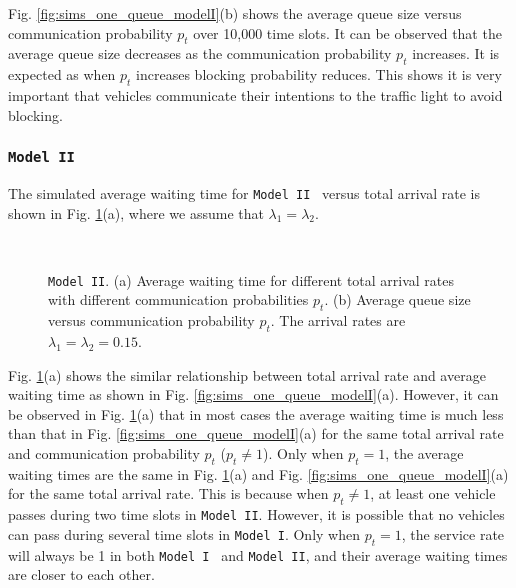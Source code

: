 \documentclass[conference]{IEEEtran}
\newcommand{\modelI}{{\tt{Model I}}}
\newcommand{\modelII}{{\tt{Model II}}}
\begin{document}
Fig. \ref{fig:sims_one_queue_modelI}(b) shows the average queue size versus communication probability $p_t$ over 10,000 time slots. It can be observed that the average queue size decreases as the communication probability $p_t$ increases. It is expected as when $p_t$ increases blocking probability reduces. This shows it is very important that vehicles communicate their intentions to the traffic light to avoid blocking.



\subsubsection{\modelII}
The simulated average waiting time for \modelII~ versus total arrival rate is shown in Fig. \ref{fig:sims_one_queue_modelII}(a), where we assume that $\lambda_1=\lambda_2$.

\begin{figure}[t!]
\vspace{10pt}
\begin{center}
 \\
\end{center}
\begin{center}
\vspace{-5pt}
\caption{\label{fig:sims_one_queue_modelII} \modelII. (a) Average waiting time for different total arrival rates with different communication probabilities $p_t$. (b) Average queue size versus communication probability $p_t$. The arrival rates are $\lambda_1=\lambda_2=0.15$.}
\vspace{-25pt}
\end{center}
\end{figure}



Fig. \ref{fig:sims_one_queue_modelII}(a) shows the similar relationship between total arrival rate and average waiting time as shown in Fig. \ref{fig:sims_one_queue_modelI}(a). However, it can be observed in Fig. \ref{fig:sims_one_queue_modelII}(a) that in most cases the average waiting time is much less than that in Fig. \ref{fig:sims_one_queue_modelI}(a) for the same total arrival rate and communication probability $p_t$ ($p_t\neq 1$). Only when $p_t=1$, the average waiting times are the same in Fig. \ref{fig:sims_one_queue_modelII}(a) and Fig. \ref{fig:sims_one_queue_modelI}(a) for the same total arrival rate. This is because when $p_t\neq 1$, at least one vehicle passes during two time slots in \modelII. However, it is possible that no vehicles can pass during several time slots in \modelI. Only when $p_t=1$, the service rate will always be 1 in both \modelI~ and \modelII, and their average waiting times are closer to each other. 
\end{document}
